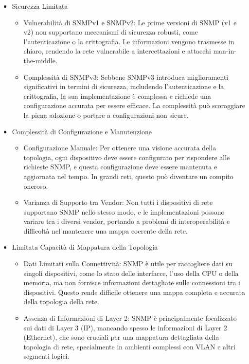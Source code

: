 \documentclass[target=bach,aauheader=,style=]{thud}
\begin{document}
\begin{itemize}
  \item Sicurezza Limitata
    \begin{itemize}
      \item Vulnerabilità di SNMPv1 e SNMPv2: Le prime versioni di SNMP (v1 e v2) non supportano meccanismi di sicurezza robusti, come l'autenticazione o la crittografia. Le informazioni vengono trasmesse in chiaro, rendendo la rete vulnerabile a intercettazioni e attacchi man-in-the-middle.
      \item Complessità di SNMPv3: Sebbene SNMPv3 introduca miglioramenti significativi in termini di sicurezza, includendo l'autenticazione e la crittografia, la sua implementazione è complessa e richiede una configurazione accurata per essere efficace. La complessità può scoraggiare la piena adozione o portare a configurazioni non sicure.
    \end{itemize}

  \item Complessità di Configurazione e Manutenzione
    \begin{itemize}
      \item Configurazione Manuale: Per ottenere una visione accurata della topologia, ogni dispositivo deve essere configurato per rispondere alle richieste SNMP, e questa configurazione deve essere mantenuta e aggiornata nel tempo. In grandi reti, questo può diventare un compito oneroso.
      \item Varianza di Supporto tra Vendor: Non tutti i dispositivi di rete supportano SNMP nello stesso modo, e le implementazioni possono variare tra i diversi vendor, portando a problemi di interoperabilità e difficoltà nel mantenere una mappa coerente della rete.
    \end{itemize}

  \item Limitata Capacità di Mappatura della Topologia
    \begin{itemize}
      \item Dati Limitati sulla Connettività: SNMP è utile per raccogliere dati su singoli dispositivi, come lo stato delle interfacce, l'uso della CPU o della memoria, ma non fornisce informazioni dettagliate sulle connessioni tra i dispositivi. Questo rende difficile ottenere una mappa completa e accurata della topologia della rete.
      \item Assenza di Informazioni di Layer 2: SNMP è principalmente focalizzato sui dati di Layer 3 (IP), mancando spesso le informazioni di Layer 2 (Ethernet), che sono cruciali per una mappatura dettagliata della topologia di rete, specialmente in ambienti complessi con VLAN e altri segmenti logici.
    \end{itemize}



\end{itemize}
\end{document}
